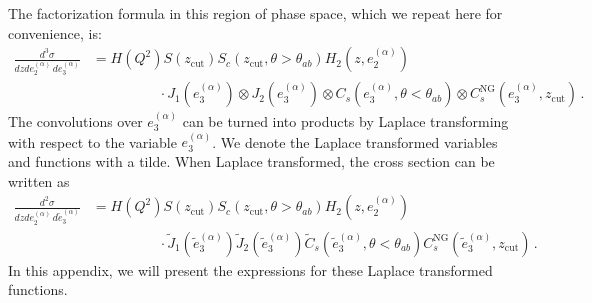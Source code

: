 \documentclass[a4paper,11pt]{article}
\newcommand{\ecf}[2]{e_{#1}^{(#2)}}
\newcommand{\ecflp}[2]{\tilde e_{#1}^{(#2)}}
\newcommand{\nn}{\nonumber}
\def\zcut{z_{\text{cut}}}
\begin{document}
The factorization formula in this region of phase space, which we repeat here for convenience, is:
{\small\begin{align}\label{eq:ninjafact_repeat}
\frac{d^3\sigma}{dz d\ecf{2}{\alpha}\, d\ecf{3}{\alpha} }&= H(Q^2) S(\zcut) S_c(\zcut,\theta>\theta_{ab}) H_2(z,\ecf{2}{\alpha})\nn \\
&\hspace{2cm}\cdot J_1(\ecf{3}{\alpha})\otimes J_2(\ecf{3}{\alpha})\otimes C_s(\ecf{3}{\alpha},\theta<\theta_{ab})\otimes C^{\text{NG}}_s(\ecf{3}{\alpha},\zcut) \,.
\end{align}}
The convolutions over $\ecf{3}{\alpha}$ can be turned into products by Laplace transforming with respect to the variable $\ecf{3}{\alpha}$. We denote the Laplace transformed variables and functions with a tilde.  When Laplace transformed, the cross section can be written as
{\small\begin{align}
\frac{d^2\sigma}{dz d\ecf{2}{\alpha}\, d\ecflp{3}{\alpha} }&= H(Q^2) S(\zcut) S_c(\zcut,\theta>\theta_{ab}) H_2(z,\ecf{2}{\alpha}) \nn \\
&\hspace{2cm} \cdot \tilde J_1(\ecflp{3}{\alpha}) \tilde J_2(\ecflp{3}{\alpha}) \tilde C_s(\ecflp{3}{\alpha},\theta<\theta_{ab}) C^{\text{NG}}_s(\ecflp{3}{\alpha},\zcut) \,.
\end{align}}
In this appendix, we will present the expressions for these Laplace transformed functions.

\end{document}
